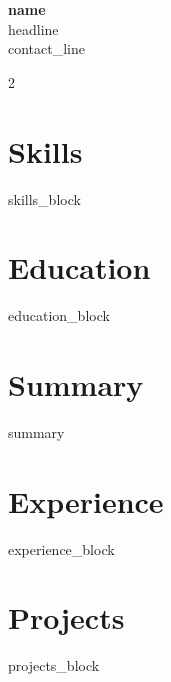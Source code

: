 \documentclass[11pt,a4paper]{article}
\begin{document}
\begin{center}
  {\Huge\bfseries\color{primary} {{name}}}\\[3pt]
  {\normalsize\color{accent} {{headline}}}\\[4pt]
  {\small {{contact_line}}}
\end{center}
\vspace{4pt}

\begin{paracol}{2}
\section*{Skills}
{{skills_block}}

\section*{Education}
{{education_block}}

\switchcolumn
\section*{Summary}
{{summary}}

\section*{Experience}
{{experience_block}}

\section*{Projects}
{{projects_block}}

\end{paracol}
\end{document}
